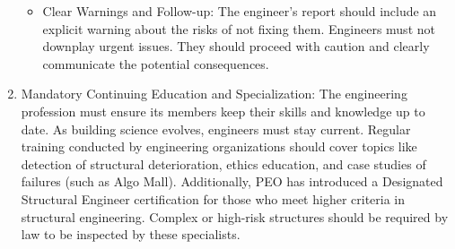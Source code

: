 \documentclass[12pt]{article}
\begin{document}
\begin{enumerate}
\begin{itemize}
        \item Clear Warnings and Follow-up: The engineer’s report should include an explicit warning about the risks of not fixing them. Engineers must not downplay urgent issues. They should proceed with caution and clearly communicate the potential consequences.
    \end{itemize}
    
    \item Mandatory Continuing Education and Specialization: The engineering profession must ensure its members keep their skills and knowledge up to date. As building science evolves, engineers must stay current.  Regular training conducted by engineering organizations should cover topics like detection of structural deterioration, ethics education, and case studies of failures (such as Algo Mall). Additionally, PEO has introduced a Designated Structural Engineer certification for those who meet higher criteria in structural engineering. Complex or high-risk structures should be required by law to be inspected by these specialists. 
\end{enumerate}
\end{document}
